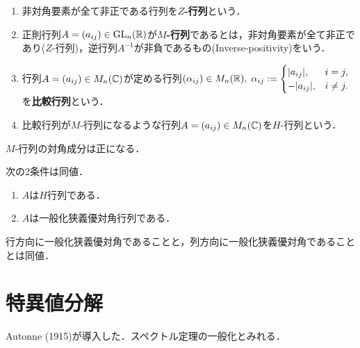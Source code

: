 \documentclass[uplatex, dvipdfmx]{jsreport}
\begin{document}
\begin{definition}\mbox{}
    \begin{enumerate}
        \item 非対角要素が全て非正である行列を\textbf{$Z$-行列}という．
        \item 正則行列$A=(a_{ij})\in\mathrm{GL}_n(\mathbb{R})$が\textbf{$M$-行列}であるとは，非対角要素が全て非正であり($Z$-行列)，逆行列$A^{-1}$が非負であるもの(Inverse-positivity)をいう．
        \item 行列$A=(a_{ij})\in M_n(\mathbb{C})$が定める行列$(\alpha_{ij})\in M_n(\mathbb{R}),\;\alpha_{ij}:=\begin{cases}
            \lvert a_{ij}\rvert,&i=j,\\
            -\lvert a_{ij}\rvert,&i\ne j.
        \end{cases}$を\textbf{比較行列}という．
        \item 比較行列が$M$-行列になるような行列$A=(a_{ij})\in M_n(\mathbb{C})$を$H$-行列という．
    \end{enumerate}
\end{definition}

\begin{lemma}
    $M$-行列の対角成分は正になる．
\end{lemma}

\begin{lemma}
    次の2条件は同値．
    \begin{enumerate}
        \item $A$は$H$行列である．
        \item $A$は一般化狭義優対角行列である．
    \end{enumerate}
\end{lemma}

\begin{corollary}
    行方向に一般化狭義優対角であることと，列方向に一般化狭義優対角であることとは同値．
\end{corollary}

\section{特異値分解}

\begin{tcolorbox}[colframe=ForestGreen, colback=ForestGreen!10!white,breakable,colbacktitle=ForestGreen!40!white,coltitle=black,fonttitle=\bfseries\sffamily,
title=]
    Autonne (1915)が導入した．スペクトル定理の一般化とみれる．
\end{tcolorbox}
\end{document}
